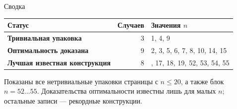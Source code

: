 \documentclass[aspectratio=169,10pt]{beamer}
\newcommand{\statusProved}{\textcolor{cProved}{\textbf{Оптимальность доказана}}}
\newcommand{\statusFound}{\textcolor{cFound}{\textbf{Лучшая известная конструкция}}}
\newcommand{\statusTrivial}{\textcolor{cTrivial}{\textbf{Тривиальная упаковка}}}
\begin{document}
\begin{frame}{Сводка}
\footnotesize
\centering
\begin{tabular}{@{}lr p{}@{}}
\toprule
Статус & Случаев & Значения $n$ \\
\midrule

\statusTrivial & 3 & 1, 4, 9 \\
\statusProved & 9 & 2, 3, 5, 6, 7, 8, 10, 14, 15 \\
\statusFound & 8 & \raggedright\arraybackslash 11, 17, 18, 19, 52, 53, 54, 55 \\
\bottomrule
\end{tabular}

\vspace{1em}
\begin{minipage}{0.86\textwidth}\scriptsize\color{cMuted}
Показаны все нетривиальные упаковки страницы с $n \le 20$, а также блок $n = 52\ldots55$.
Доказательства оптимальности известны лишь для малых $n$; остальные записи — рекордные конструкции.
\end{minipage}
\end{frame}
\end{document}
